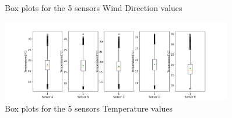 \documentclass[a4paper,12pt]{article} %
\begin{document}
\begin{enumerate}
\begin{figure}[H]
    \caption{Box plots for the 5 sensors Wind Direction values} %
  \end{figure}
\begin{figure}[H] %
    \centering %
    \includegraphics[width=0.9\textwidth]{boxplot_temperature.png} 
    \caption{Box plots for the 5 sensors Temperature values} %
  \end{figure}
\newpage    
  

\end{enumerate}
\end{document}
